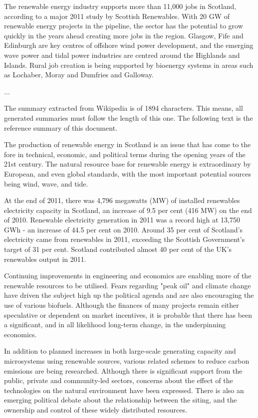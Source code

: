 \begin{tcolorbox}
\noindent
The renewable energy industry supports more than 11,000 jobs in Scotland, according to a major 2011 study by Scottish Renewables. With 20 GW of renewable energy projects in the pipeline, the sector has the potential to grow quickly in the years ahead creating more jobs in the region. Glasgow, Fife and Edinburgh are key centres of offshore wind power development, and the emerging wave power and tidal power industries are centred around the Highlands and Islands. Rural job creation is being supported by bioenergy systems in areas such as Lochaber, Moray and Dumfries and Galloway. 

\noindent
{\huge ...}
\end{tcolorbox}

The summary extracted from Wikipedia is of 1894 characters. 
This means, all generated summaries must follow the length of this one. 
The following text is the reference summary of this document. 

\begin{tcolorbox}\footnotesize
	
	\noindent
	The production of renewable energy in Scotland is an issue that has come to the fore in technical, economic, and political terms during the opening years of the 21st century. The natural resource base for renewable energy is extraordinary by European, and even global standards, with the most important potential sources being wind, wave, and tide.
	
	\noindent
	At the end of 2011, there was 4,796 megawatts (MW) of installed renewables electricity capacity in Scotland, an increase of 9.5 per cent (416 MW) on the end of 2010. Renewable electricity generation in 2011 was a record high at 13,750 GWh - an increase of 44.5 per cent on 2010. Around 35 per cent of Scotland’s electricity came from renewables in 2011, exceeding the Scottish Government’s target of 31 per cent. Scotland contributed almost 40 per cent of the UK’s renewables output in 2011. 
	
	\noindent
	Continuing improvements in engineering and economics are enabling more of the renewable resources to be utilised. Fears regarding "peak oil" and climate change have driven the subject high up the political agenda and are also encouraging the use of various biofuels. Although the finances of many projects remain either speculative or dependent on market incentives, it is probable that there has been a significant, and in all likelihood long-term change, in the underpinning economics. 
	
	\noindent
	In addition to planned increases in both large-scale generating capacity and microsystems using renewable sources, various related schemes to reduce carbon emissions are being researched. Although there is significant support from the public, private and community-led sectors, concerns about the effect of the technologies on the natural environment have been expressed. There is also an emerging political debate about the relationship between the siting, and the ownership and control of these widely distributed resources. 
\end{tcolorbox}

